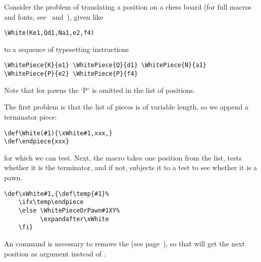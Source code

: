 \documentclass[letterpaper]{book}
\begin{document}
Consider the problem of translating a position on a chess board
(for full macros and fonts, see~\cite{chess} and~\cite{Tut}),
given like
\begin{verbatim}
\White(Ke1,Qd1,Na1,e2,f4)
\end{verbatim} 
to a sequence of typesetting instructions
\begin{verbatim}
\WhitePiece{K}{e1} \WhitePiece{Q}{d1} \WhitePiece{N}{a1} 
\WhitePiece{P}{e2} \WhitePiece{P}{f4}
\end{verbatim}
Note that for pawns the `P' is omitted in the list of positions.

The first problem is that the list of pieces 
is of variable length, so we append a terminator piece:
\begin{verbatim}
\def\White(#1){\xWhite#1,xxx,}
\def\endpiece{xxx}
\end{verbatim}
for which we can test.
Next, the macro  takes one position from the list,
tests whether it is the terminator, and if not,
subjects it to a test to see whether it is a pawn.
\begin{verbatim}
\def\xWhite#1,{\def\temp{#1}%
    \ifx\temp\endpiece 
    \else \WhitePieceOrPawn#1XY%
          \expandafter\xWhite 
    \fi}
\end{verbatim}
An  command is necessary to remove the
 (see page~\pageref{after:cond}), so that 
 will get the next position as argument
instead of .
\end{document}
